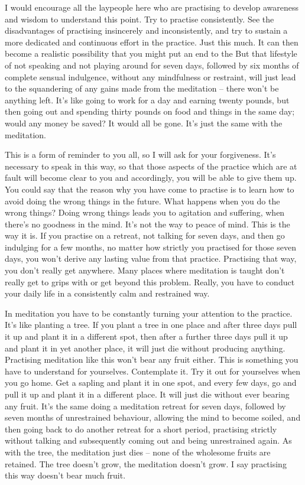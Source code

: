 I would encourage all the laypeople here who are practising to develop awareness and wisdom to understand this point. Try to practise consistently. See the disadvantages of practising insincerely and inconsistently, and try to sustain a more dedicated and continuous effort in the practice. Just this much. It can then become a realistic possibility that you might put an end to the  But that lifestyle of not speaking and not playing around for seven days, followed by six months of complete sensual indulgence, without any mindfulness or restraint, will just lead to the squandering of any gains made from the meditation -- there won't be anything left. It's like going to work for a day and earning twenty pounds, but then going out and spending thirty pounds on food and things in the same day; would any money be saved? It would all be gone. It's just the same with the meditation.

This is a form of reminder to you all, so I will ask for your forgiveness. It's necessary to speak in this way, so that those aspects of the practice which are at fault will become clear to you and accordingly, you will be able to give them up. You could say that the reason why you have come to practise is to learn how to avoid doing the wrong things in the future. What happens when you do the wrong things? Doing wrong things leads you to agitation and suffering, when there's no goodness in the mind. It's not the way to peace of mind. This is the way it is. If you practise on a retreat, not talking for seven days, and then go indulging for a few months, no matter how strictly you practised for those seven days, you won't derive any lasting value from that practice. Practising that way, you don't really get anywhere. Many places where meditation is taught don't really get to grips with or get beyond this problem. Really, you have to conduct your daily life in a consistently calm and restrained way.

In meditation you have to be constantly turning your attention to the practice. It's like planting a tree. If you plant a tree in one place and after three days pull it up and plant it in a different spot, then after a further three days pull it up and plant it in yet another place, it will just die without producing anything. Practising meditation like this won't bear any fruit either. This is something you have to understand for yourselves. Contemplate it. Try it out for yourselves when you go home. Get a sapling and plant it in one spot, and every few days, go and pull it up and plant it in a different place. It will just die without ever bearing any fruit. It's the same doing a meditation retreat for seven days, followed by seven months of unrestrained behaviour, allowing the mind to become soiled, and then going back to do another retreat for a short period, practising strictly without talking and subsequently coming out and being unrestrained again. As with the tree, the meditation just dies -- none of the wholesome fruits are retained. The tree doesn't grow, the meditation doesn't grow. I say practising this way doesn't bear much fruit.

